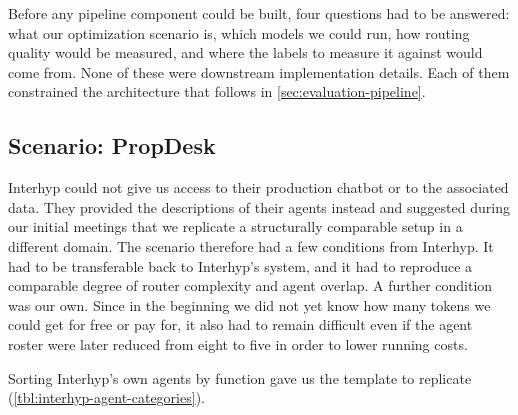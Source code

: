 \label{sec:initial-project-setup}

Before any pipeline component could be built, four questions had to be answered: what our optimization scenario is, which models we could run, how routing quality would be measured, and where the labels to measure it against would come from. None of these were downstream implementation details. Each of them constrained the architecture that follows in \cref{sec:evaluation-pipeline}.

\subsection{Scenario: PropDesk}\label{sec:propdesk-scenario}

Interhyp could not give us access to their production chatbot or to the associated data. They provided the descriptions of their agents instead and suggested during our initial meetings that we replicate a structurally comparable setup in a different domain. The scenario therefore had a few conditions from Interhyp. It had to be transferable back to Interhyp's system, and it had to reproduce a comparable degree of router complexity and agent overlap. A further condition was our own. Since in the beginning we did not yet know how many tokens we could get for free or pay for, it also had to remain difficult even if the agent roster were later reduced from eight to five in order to lower running costs.

Sorting Interhyp's own agents by function gave us the template to replicate (\cref{tbl:interhyp-agent-categories}).

